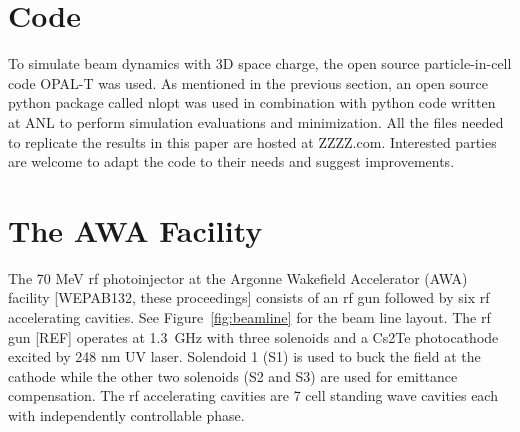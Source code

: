 \documentclass[letterpaper,  %
              ]{jacow}
\begin{document}
\section{Code}
To simulate beam dynamics with 3D space charge, 
the open source particle-in-cell code OPAL-T 
\cite{opal} was used. As mentioned in the previous section, 
an open source python package called nlopt \cite{nlopt} was used
in combination with python code written at ANL to perform simulation 
evaluations and minimization. All the files needed to replicate 
the results in this paper are hosted at ZZZZ.com. 
Interested parties are welcome to adapt the code to their needs
and suggest improvements.

\section{The AWA Facility }
The 70 MeV rf photoinjector at the Argonne Wakefield 
Accelerator (AWA) facility  [WEPAB132, these proceedings] 
consists of an rf gun followed by six rf accelerating cavities. 
See Figure~\ref{fig:beamline} for the beam line layout. 
The rf gun [REF] operates at \SI{1.3}{GHz} with three solenoids 
and a Cs2Te photocathode excited by 248 nm UV laser.  
Solendoid 1 (S1) is used to buck the field at the cathode 
while the other two solenoids (S2 and S3) are used for emittance compensation.  
The rf accelerating cavities are 7 cell standing wave 
cavities each with independently controllable phase.

\def \gunleft {-1.2}
\def \gunright {-0.3}
\end{document}
